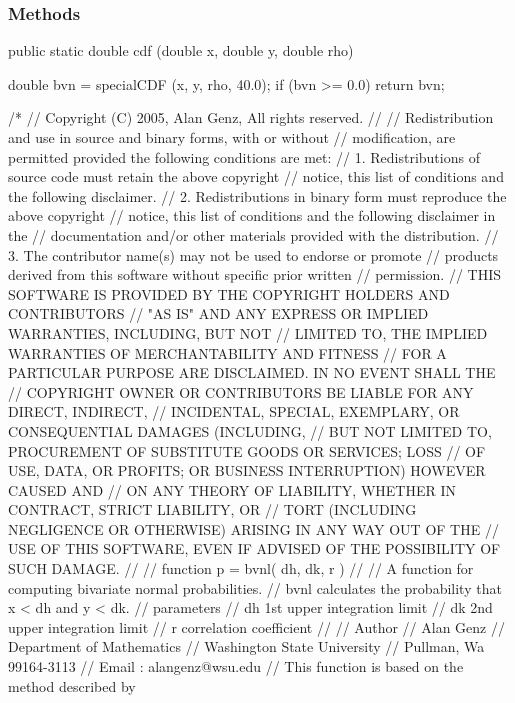 \subsubsection* {Methods}
\begin{code}

   public static double cdf (double x, double y, double rho) \begin{hide} {
      double bvn = specialCDF (x, y, rho, 40.0);
      if (bvn >= 0.0)
         return bvn;

/*
//   Copyright (C) 2005, Alan Genz,  All rights reserved.               
//
//   Redistribution and use in source and binary forms, with or without
//   modification, are permitted provided the following conditions are met:
//     1. Redistributions of source code must retain the above copyright
//        notice, this list of conditions and the following disclaimer.
//     2. Redistributions in binary form must reproduce the above copyright
//        notice, this list of conditions and the following disclaimer in the
//        documentation and/or other materials provided with the distribution.
//     3. The contributor name(s) may not be used to endorse or promote 
//        products derived from this software without specific prior written 
//        permission.
//   THIS SOFTWARE IS PROVIDED BY THE COPYRIGHT HOLDERS AND CONTRIBUTORS
//   "AS IS" AND ANY EXPRESS OR IMPLIED WARRANTIES, INCLUDING, BUT NOT 
//   LIMITED TO, THE IMPLIED WARRANTIES OF MERCHANTABILITY AND FITNESS 
//   FOR A PARTICULAR PURPOSE ARE DISCLAIMED. IN NO EVENT SHALL THE 
//   COPYRIGHT OWNER OR CONTRIBUTORS BE LIABLE FOR ANY DIRECT, INDIRECT, 
//   INCIDENTAL, SPECIAL, EXEMPLARY, OR CONSEQUENTIAL DAMAGES (INCLUDING, 
//   BUT NOT LIMITED TO, PROCUREMENT OF SUBSTITUTE GOODS OR SERVICES; LOSS 
//   OF USE, DATA, OR PROFITS; OR BUSINESS INTERRUPTION) HOWEVER CAUSED AND 
//   ON ANY THEORY OF LIABILITY, WHETHER IN CONTRACT, STRICT LIABILITY, OR 
//   TORT (INCLUDING NEGLIGENCE OR OTHERWISE) ARISING IN ANY WAY OUT OF THE 
//   USE OF THIS SOFTWARE, EVEN IF ADVISED OF THE POSSIBILITY OF SUCH DAMAGE.
//
//   function p = bvnl( dh, dk, r )
//
//  A function for computing bivariate normal probabilities.
//  bvnl calculates the probability that x < dh and y < dk. 
//    parameters  
//      dh 1st upper integration limit
//      dk 2nd upper integration limit
//      r   correlation coefficient
//
//   Author
//       Alan Genz
//       Department of Mathematics
//       Washington State University
//       Pullman, Wa 99164-3113
//       Email : alangenz@wsu.edu
//   This function is based on the method described by 
}
\end{hide}
\end{code}
